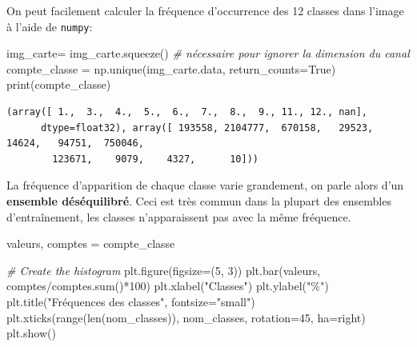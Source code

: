 \documentclass[
]{article}
\newenvironment{Shaded}{}{}
\newcommand{\BuiltInTok}[1]{\textcolor[rgb]{0.00,0.50,0.00}{#1}}
\newcommand{\CommentTok}[1]{\textcolor[rgb]{0.38,0.63,0.69}{\textit{#1}}}
\newcommand{\DecValTok}[1]{\textcolor[rgb]{0.25,0.63,0.44}{#1}}
\newcommand{\NormalTok}[1]{#1}
\newcommand{\OperatorTok}[1]{\textcolor[rgb]{0.40,0.40,0.40}{#1}}
\newcommand{\StringTok}[1]{\textcolor[rgb]{0.25,0.44,0.63}{#1}}
\newcommand{\VariableTok}[1]{\textcolor[rgb]{0.10,0.09,0.49}{#1}}
\begin{document}
On peut facilement calculer la fréquence d'occurrence des 12 classes
dans l'image à l'aide de \texttt{numpy}:

\label{8be8624a}
\label{cb8}
\begin{Shaded}
\begin{Highlighting}[]
\NormalTok{img\_carte}\OperatorTok{=}\NormalTok{ img\_carte.squeeze() }\CommentTok{\# nécessaire pour ignorer la dimension du canal}
\NormalTok{compte\_classe }\OperatorTok{=}\NormalTok{ np.unique(img\_carte.data, return\_counts}\OperatorTok{=}\VariableTok{True}\NormalTok{)}
\BuiltInTok{print}\NormalTok{(compte\_classe)}
\end{Highlighting}
\end{Shaded}

\begin{verbatim}
(array([ 1.,  3.,  4.,  5.,  6.,  7.,  8.,  9., 11., 12., nan],
      dtype=float32), array([ 193558, 2104777,  670158,   29523,   14624,   94751,  750046,
        123671,    9079,    4327,      10]))
\end{verbatim}

La fréquence d'apparition de chaque classe varie grandement, on parle
alors d'un \textbf{ensemble déséquilibré}. Ceci est très commun dans la
plupart des ensembles d'entraînement, les classes n'apparaissent pas
avec la même fréquence.

\label{adfdd31d}
\label{cb10}
\begin{Shaded}
\begin{Highlighting}[]
\NormalTok{valeurs, comptes }\OperatorTok{=}\NormalTok{ compte\_classe}

\CommentTok{\# Create the histogram}
\NormalTok{plt.figure(figsize}\OperatorTok{=}\NormalTok{(}\DecValTok{5}\NormalTok{, }\DecValTok{3}\NormalTok{))}
\NormalTok{plt.bar(valeurs, comptes}\OperatorTok{/}\NormalTok{comptes.}\BuiltInTok{sum}\NormalTok{()}\OperatorTok{*}\DecValTok{100}\NormalTok{)}
\NormalTok{plt.xlabel(}\StringTok{"Classes"}\NormalTok{)}
\NormalTok{plt.ylabel(}\StringTok{"\%"}\NormalTok{)}
\NormalTok{plt.title(}\StringTok{"Fréquences des classes"}\NormalTok{, fontsize}\OperatorTok{=}\StringTok{"small"}\NormalTok{)}
\NormalTok{plt.xticks(}\BuiltInTok{range}\NormalTok{(}\BuiltInTok{len}\NormalTok{(nom\_classes)), nom\_classes, rotation}\OperatorTok{=}\DecValTok{45}\NormalTok{, ha}\OperatorTok{=}\StringTok{\textquotesingle{}right\textquotesingle{}}\NormalTok{)}
\NormalTok{plt.show()}
\end{Highlighting}
\end{Shaded}
\end{document}
